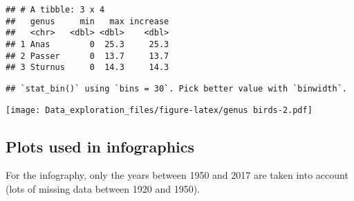 \documentclass[]{article}
\newenvironment{Shaded}{\begin{snugshade}}{\end{snugshade}}
\newcommand{\KeywordTok}[1]{\textcolor[rgb]{0.13,0.29,0.53}{\textbf{#1}}}
\newcommand{\DecValTok}[1]{\textcolor[rgb]{0.00,0.00,0.81}{#1}}
\newcommand{\StringTok}[1]{\textcolor[rgb]{0.31,0.60,0.02}{#1}}
\newcommand{\CommentTok}[1]{\textcolor[rgb]{0.56,0.35,0.01}{\textit{#1}}}
\newcommand{\OperatorTok}[1]{\textcolor[rgb]{0.81,0.36,0.00}{\textbf{#1}}}
\newcommand{\NormalTok}[1]{#1}
\begin{document}
\begin{Shaded}
\end{Shaded}

\begin{verbatim}
## # A tibble: 3 x 4
##   genus     min   max increase
##   <chr>   <dbl> <dbl>    <dbl>
## 1 Anas        0  25.3     25.3
## 2 Passer      0  13.7     13.7
## 3 Sturnus     0  14.3     14.3
\end{verbatim}

\begin{Shaded}
\end{Shaded}

\begin{verbatim}
## `stat_bin()` using `bins = 30`. Pick better value with `binwidth`.
\end{verbatim}

\texttt{[image: Data\_exploration\_files/figure-latex/genus birds-2.pdf]}

\subsection{Plots used in
infographics}\label{plots-used-in-infographics}

For the infography, only the years between 1950 and 2017 are taken into
account (lots of missing data between 1920 and 1950).
\end{document}
